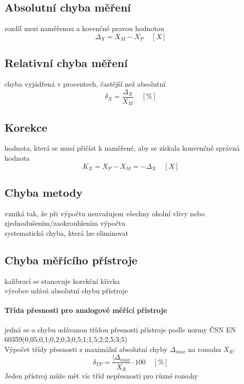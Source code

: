 \subsection*{Absolutní chyba měření}
rozdíl mezi naměřenou a kovenčně pravou hodnotou
\begin{equation}
    \Delta_X = X_M - X_P \;\;\;\; [X]
\end{equation}
\subsection*{Relativní chyba měření}
chyba vyjádřená v procentech, častější než absolutní
\begin{equation}
    \delta_X = \frac{\Delta_X}{X_M} \;\;\;\; [\%]
\end{equation}
\subsection*{Korekce}
hodnota, která se musí přičíst k naměřené, aby se získala konvenčně správná hodnota
\begin{equation}
    K_X = X_P - X_M = -\Delta_X \;\;\;\; [X]
\end{equation}
\subsection*{Chyba metody}
vzniká tak, že při výpočtu neuvažujem všechny okolní vlivy nebo zjednodušením/zaokrouhlením výpočtu\\
systematická chyba, která lze eliminovat
\subsection*{Chyba měřícího přístroje}
kalibrací se stanovuje korekční křivka\\
výrobce udává absolutní chybu přístroje\\
\paragraph*{Třída přesnosti pro analogové měřící přístroje}
jedná se o chybu udávanou třídou přesnosti přístroje podle normy ČSN EN 60359(0,05;0,1;0,2;0,3;0,5;1;1,5;2;2,5;3;5)\\
Výpočet třídy přesnosti z maximální absolutní chyby $\Delta_{max}$ na rozsahu $X_R$:
\begin{equation}
    \delta_{TP} = \frac{|\Delta_{max}}{X_R}\cdot 100 \;\;\;\; [\%]
\end{equation}
Jeden přístroj může mět víc tříd nepřesnosti pro různé rozsahy\\
